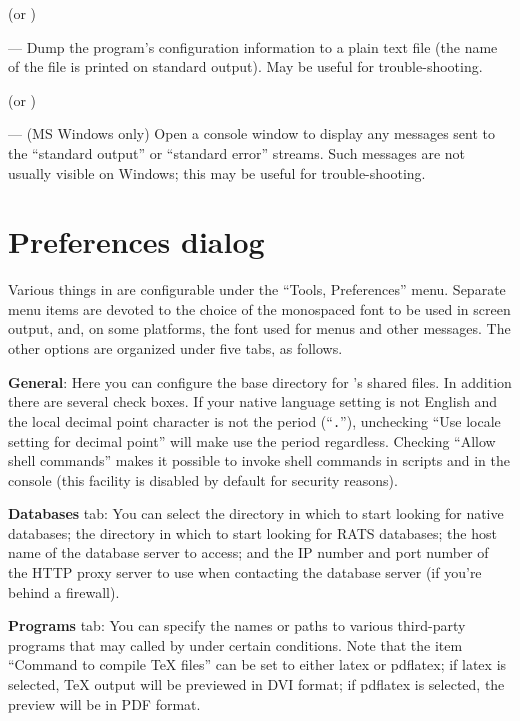  (or )
      
--- Dump the program's configuration information to a plain text file
(the name of the file is printed on standard output).  May be useful
for trouble-shooting.
      
 (or )

--- (MS Windows only) Open a console window to display any messages
sent to the ``standard output'' or ``standard error'' streams.  Such
messages are not usually visible on Windows; this may be useful for
trouble-shooting.
      
\section{Preferences dialog}
\label{guiprefs}

Various things in  are configurable under the ``Tools,
Preferences'' menu.  Separate menu items are devoted to the choice of
the monospaced font to be used in  screen output, and, on
some platforms, the font used for menus and other messages.  The other
options are organized under five tabs, as follows.
      
\textbf{General}: Here you can configure the base directory for
's shared files. In addition there are several check
boxes. If your native language setting is not English and the local
decimal point character is not the period (``\texttt{.}''), unchecking
``Use locale setting for decimal point'' will make  use the
period regardless.  Checking ``Allow shell commands'' makes it
possible to invoke shell commands in scripts and in the 
console (this facility is disabled by default for security reasons).
      
\textbf{Databases} tab: You can select the directory in which to start
looking for native  databases; the directory in which to
start looking for RATS databases; the host name of the 
database server to access; and the IP number and port number of the
HTTP proxy server to use when contacting the database server (if
you're behind a firewall).
      
\textbf{Programs} tab: You can specify the names or paths to various
third-party programs that may called by  under certain
conditions. Note that the item ``Command to compile {\TeX} files'' can
be set to either latex or pdflatex; if latex is selected, {\TeX}
output will be previewed in DVI format; if pdflatex is selected, the
preview will be in PDF format.
      
